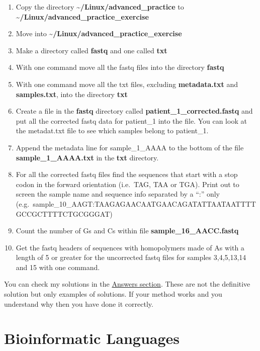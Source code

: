 \documentclass[
  letterpaper,
  DIV=11,
  numbers=noendperiod]{scrreprt}
\providecommand{\tightlist}{%
  \setlength{\itemsep}{0pt}\setlength{\parskip}{0pt}}
\begin{document}
\begin{enumerate}
\def\labelenumi{\arabic{enumi}.}
\tightlist
\item
  Copy the directory \textbf{\textasciitilde/Linux/advanced\_practice}
  to \textbf{\textasciitilde/Linux/advanced\_practice\_exercise}
\item
  Move into \textbf{\textasciitilde/Linux/advanced\_practice\_exercise}
\item
  Make a directory called \textbf{fastq} and one called \textbf{txt}
\item
  With one command move all the fastq files into the directory
  \textbf{fastq}
\item
  With one command move all the txt files, excluding
  \textbf{metadata.txt} and \textbf{samples.txt}, into the directory
  \textbf{txt}
\item
  Create a file in the \textbf{fastq} directory called
  \textbf{patient\_1\_corrected.fastq} and put all the corrected fastq
  data for patient\_1 into the file. You can look at the metadat.txt
  file to see which samples belong to patient\_1.
\item
  Append the metadata line for sample\_1\_AAAA to the bottom of the file
  \textbf{sample\_1\_AAAA.txt} in the \textbf{txt} directory.
\item
  For all the corrected fastq files find the sequences that start with a
  stop codon in the forward orientation (i.e.~TAG, TAA or TGA). Print
  out to screen the sample name and sequence info separated by a ``:''
  only
  (e.g.~sample\_10\_AAGT:TAAGAGAACAATGAACAGATATTAATAATTTTGCCGCTTTTCTGCGGGAT)
\item
  Count the number of Gs and Cs within file
  \textbf{sample\_16\_AACC.fastq}
\item
  Get the fastq headers of sequences with homopolymers made of As with a
  length of 5 or greater for the uncorrected fastq files for samples
  3,4,5,13,14 and 15 with one command.
\end{enumerate}

You can check my solutions in the \hyperref[exerciseadv_answers]{Answers
section}. These are not the definitive solution but only examples of
solutions. If your method works and you understand why then you have
done it correctly.

\chapter{Bioinformatic Languages}\label{bfxlanguages}
\end{document}
